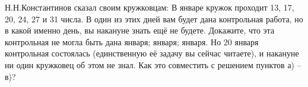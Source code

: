 \documentclass[a4paper,11pt]{article}
\newcommand{\0}[1]{\overline{#1}}
\begin{document}
Н.Н.Константинов сказал своим %
кружковцам:  В январе кружок %
проходит 13, 17, 20, 24, 27 и 31 числа. В один из этих дней
вам будет дана %
контрольная работа, но в какой
именно день, вы накануне знать ещ\"е не будете.
Докажите, что эта контрольная не могла быть дана %
 января;
 января;
 января.
Но 20 января контрольная состоялась (единственную её задачу вы сейчас читаете), и накануне ни один кружковец об этом не знал. Как это совместить с решением пунктов а) -- в)?



\end{document}
